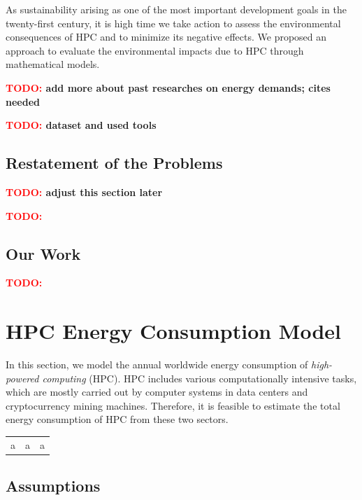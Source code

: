 \documentclass[12pt]{article}
\newcommand{\todo}[1]{\textbf{\textcolor{red}{TODO:} #1}}
\begin{document}
As sustainability arising as one of the most important development goals in the twenty-first century, it is high time we take action to assess the environmental consequences of HPC and to minimize its negative effects. We proposed an approach to evaluate the environmental impacts due to HPC through mathematical models.

\todo{add more about past researches on energy demands; cites needed}

\todo{dataset and used tools}

\subsection{Restatement of the Problems}

\todo{adjust this section later}

\todo{}

\subsection{Our Work}

\todo{}

\section{HPC Energy Consumption Model}

In this section, we model the annual worldwide energy consumption of \textit{high-powered computing} (HPC). HPC includes various computationally intensive tasks, which are mostly carried out by computer systems in data centers and cryptocurrency mining machines. Therefore, it is feasible to estimate the total energy consumption of HPC from these two sectors.

\begin{table}[t]
	\begin{tabular}{ccc}
		a&a&a \\
	\end{tabular}
\end{table}

\subsection{Assumptions}
\end{document}
